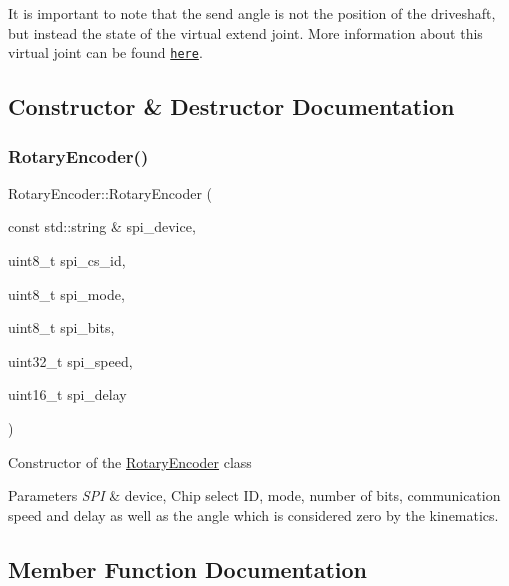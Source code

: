It is important to note that the send angle is not the position of the driveshaft, but instead the state of the virtual extend joint. More information about this virtual joint can be found \href{https://github.com/TriPed-Robot/TriPed-Reference-Document}{\tt here}. 

\subsection{Constructor \& Destructor Documentation}
\mbox{\label{classRotaryEncoder_ac57e2531f91e03b48bcc2b7e3f0edf62}} 
\subsubsection{\texorpdfstring{Rotary\+Encoder()}{RotaryEncoder()}}
{\footnotesize\ttfamily Rotary\+Encoder\+::\+Rotary\+Encoder (\begin{DoxyParamCaption}\item[{const std\+::string \&}]{spi\+\_\+device,  }\item[{uint8\+\_\+t}]{spi\+\_\+cs\+\_\+id,  }\item[{uint8\+\_\+t}]{spi\+\_\+mode,  }\item[{uint8\+\_\+t}]{spi\+\_\+bits,  }\item[{uint32\+\_\+t}]{spi\+\_\+speed,  }\item[{uint16\+\_\+t}]{spi\+\_\+delay }\end{DoxyParamCaption})}

Constructor of the \hyperlink{classRotaryEncoder}{Rotary\+Encoder} class 
\begin{DoxyParams}{Parameters}
{\em S\+PI} & device, Chip select ID, mode, number of bits, communication speed and delay as well as the angle which is considered zero by the kinematics. \\
\hline
\end{DoxyParams}


\subsection{Member Function Documentation}
\mbox{\label{classRotaryEncoder_adf89df36f38d0ee87b454f22c25a85f0}} 
